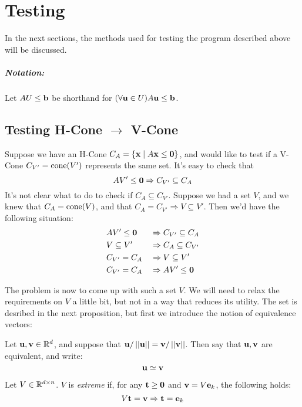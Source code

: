 \chapter{Testing}

In the next sections, the methods used for testing the program described above will be discussed.

\paragraph{Notation:} Let $AU \leq \mathbf{b}$ be shorthand for $(\forall \mathbf{u}\in U) A\mathbf{u} \leq \mathbf{b}$.

\section{Testing H-Cone $\to$ V-Cone}
Suppose we have an H-Cone $C_A= \left\{\mathbf{x}\;|\; A\mathbf{x}\leq\mathbf{0}\right\}$, and would like to test if a V-Cone $C_{V'} = \operatorname{cone}(V')$ represents the same set.  It's easy to check that
\[ AV'\leq\mathbf{0} \Rightarrow C_{V'} \subseteq C_A\]
It's not clear what to do to check if $C_A\subseteq C_{V'}$.  Suppose we had a set $V$, and we knew that $C_A= \operatorname{cone}(V)$, and that $C_A= C_{V'} \Rightarrow V \subseteq V'$.  Then we'd have the following situation:
\begin{alignat*}{2}
	 & AV'\leq\mathbf{0} \;      & \Rightarrow & \; C_{V'} \subseteq C_A \\
	 & V \subseteq V' \; & \Rightarrow & \; C_A\subseteq C_{V'}  \\
	 & C_{V'} = C_A \;   & \Rightarrow & \; V \subseteq V'       \\
	 & C_{V'} = C_A \;   & \Rightarrow & \; AV'\leq\mathbf{0}
\end{alignat*}

The problem is now to come up with such a set $V$.  We will need to relax the requirements on $V$ a little bit, but not in a way that reduces its utility.  The set is desribed in the next proposition, but first we introduce the notion of equivalence vectors:

\begin{Def}
	Let $\mathbf{u},\mathbf{v} \in \mathbb{R}^d$, and suppose that $\mathbf{u}/\left|\left|\mathbf{u}\right|\right| = \mathbf{v}/\left|\left|\mathbf{v}\right|\right|$.  Then say that $\mathbf{u},\mathbf{v}$ are equivalent, and write:
	\[ \mathbf{u} \simeq \mathbf{v} \]
\end{Def}

\begin{Def}[Extreme]
	Let $V \in \mathbb{R}^{d\times n}$.  $V$ is \textit{extreme} if, for any $\mathbf{t}\geq\mathbf{0}$ and $\mathbf{v} = V\mathbf{e}_k$, the following holds:
  \[V\mathbf{t} = \mathbf{v} \Rightarrow \mathbf{t} = \mathbf{e}_k \]
\end{Def}

